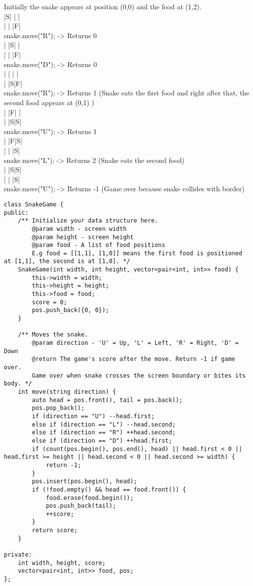 Initially the snake appears at position (0,0) and the food at (1,2).\\
|S| | |\\
| | |F|\\

snake.move("R"); -> Returns 0\\
| |S| |\\
| | |F|\\

snake.move("D"); -> Returns 0\\
| | | |\\
| |S|F|\\

snake.move("R"); -> Returns 1 (Snake eats the first food and right after that, the second food appears at (0,1) )\\
| |F| |\\
| |S|S|\\

snake.move("U"); -> Returns 1\\
| |F|S|\\
| | |S|\\

snake.move("L"); -> Returns 2 (Snake eats the second food)\\
| |S|S|\\
| | |S|\\

snake.move("U"); -> Returns -1 (Game over because snake collides with border)\\

\begin{lstlisting}
class SnakeGame {
public:
    /** Initialize your data structure here.
        @param width - screen width
        @param height - screen height 
        @param food - A list of food positions
        E.g food = [[1,1], [1,0]] means the first food is positioned at [1,1], the second is at [1,0]. */
    SnakeGame(int width, int height, vector<pair<int, int>> food) {
        this->width = width;
        this->height = height;
        this->food = food;
        score = 0;
        pos.push_back({0, 0});
    }
    
    /** Moves the snake.
        @param direction - 'U' = Up, 'L' = Left, 'R' = Right, 'D' = Down 
        @return The game's score after the move. Return -1 if game over. 
        Game over when snake crosses the screen boundary or bites its body. */
    int move(string direction) {
        auto head = pos.front(), tail = pos.back();
        pos.pop_back();
        if (direction == "U") --head.first;
        else if (direction == "L") --head.second;
        else if (direction == "R") ++head.second;
        else if (direction == "D") ++head.first;
        if (count(pos.begin(), pos.end(), head) || head.first < 0 || head.first >= height || head.second < 0 || head.second >= width) {
            return -1;
        }
        pos.insert(pos.begin(), head);
        if (!food.empty() && head == food.front()) {
            food.erase(food.begin());
            pos.push_back(tail);
            ++score;
        }
        return score;
    }

private:
    int width, height, score;
    vector<pair<int, int>> food, pos;
};
\end{lstlisting}


